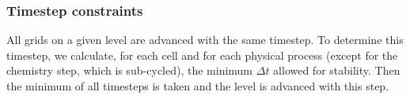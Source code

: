 \subsubsection{Timestep constraints}

All grids on a given level are advanced with the same timestep.  To
determine this timestep, we calculate, for each cell and for each
physical process (except for the chemistry step, which is sub-cycled),
the minimum $\Delta t$ allowed for stability.  Then the minimum of all
timesteps is taken and the level is advanced with this step.

